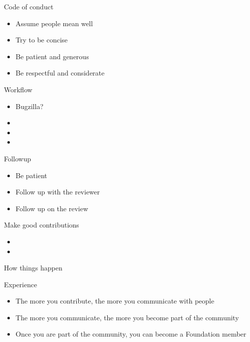 \documentclass{beamer}
\begin{document}
\begin{frame}{Code of conduct}
  \begin{itemize}
  \item
    Assume people mean well
  \item
    Try to be concise
  \item
    Be patient and generous
  \item
    Be respectful and considerate
  \end{itemize}
\end{frame}

\begin{frame}{Workflow}
  \begin{itemize}
  \item
    Bugzilla?
  \item
  \item
  \item
  \end{itemize}
\end{frame}

\begin{frame}{Followup}
  \begin{itemize}
  \item
    Be patient
  \item
    Follow up with the reviewer
  \item
    Follow up on the review
  \end{itemize}
\end{frame}

\begin{frame}{Make good contributions}
  \begin{itemize}
  \item
    
  \item
  \end{itemize}
\end{frame}

\begin{frame}{How things happen}
\end{frame}

\begin{frame}{Experience}
  \begin{itemize}
  \item
    The more you contribute, the more you communicate with people
  \item
    The more you communicate, the more you become part of the community
  \item
    Once you are part of the community, you can become a Foundation member
  \end{itemize} 
\end{frame}
\end{document}
